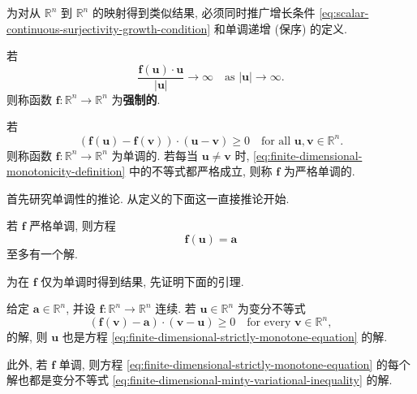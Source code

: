 为对从 $\mathbb{R}^n$ 到 $\mathbb{R}^n$ 的映射得到类似结果, 必须同时推广增长条件 \eqref{eq:scalar-continuous-surjectivity-growth-condition} 和单调递增 (保序) 的定义.

\begin{Definition}
\label{def:finite-dimensional-coercive-mapping}
若
\begin{equation}\label{eq:finite-dimensional-nonlinear-coercivity-definition}
\dfrac{\bm{f}(\bm{u})\cdot\bm{u}}{|\bm{u}|}\to\infty\quad\text{as }|\bm{u}|\to\infty.
\end{equation}
则称函数 $\bm{f}:\mathbb{R}^n\to\mathbb{R}^n$ 为\textbf{强制的}.
\end{Definition}

\begin{Definition}
\label{def:finite-dimensional-monotone-mapping}
若
\begin{equation}\label{eq:finite-dimensional-monotonicity-definition}
(\bm{f}(\bm{u})-\bm{f}(\bm{v}))\cdot(\bm{u}-\bm{v})\geq0\quad\text{for all }\bm{u},\bm{v}\in\mathbb{R}^n.
\end{equation}
则称函数 $\bm{f}:\mathbb{R}^n\to\mathbb{R}^n$ 为单调的. 若每当 $\bm{u}\neq\bm{v}$ 时, \eqref{eq:finite-dimensional-monotonicity-definition} 中的不等式都严格成立, 则称 $\bm{f}$ 为严格单调的.
\end{Definition}

首先研究单调性的推论. 从定义的下面这一直接推论开始.

\begin{Theorem}
\label{thm:finite-dimensional-strict-monotonicity-uniqueness}
若 $\bm{f}$ 严格单调, 则方程
\begin{equation}\label{eq:finite-dimensional-strictly-monotone-equation}
\bm{f}(\bm{u})=\bm{a}
\end{equation}
至多有一个解.
\end{Theorem}

为在 $\bm{f}$ 仅为单调时得到结果, 先证明下面的引理.

\begin{Lemma}
\label{lem:finite-dimensional-minty-equivalence}
给定 $\bm{a}\in\mathbb{R}^n$, 并设 $\bm{f}:\mathbb{R}^n\to\mathbb{R}^n$ 连续. 若 $\bm{u}\in\mathbb{R}^n$ 为变分不等式
\begin{equation}\label{eq:finite-dimensional-minty-variational-inequality}
(\bm{f}(\bm{v})-\bm{a})\cdot(\bm{v}-\bm{u})\geq0\quad\text{for every }\bm{v}\in\mathbb{R}^n,
\end{equation}
的解, 则 $\bm{u}$ 也是方程 \eqref{eq:finite-dimensional-strictly-monotone-equation} 的解.

此外, 若 $\bm{f}$ 单调, 则方程 \eqref{eq:finite-dimensional-strictly-monotone-equation} 的每个解也都是变分不等式 \eqref{eq:finite-dimensional-minty-variational-inequality} 的解.
\end{Lemma}


